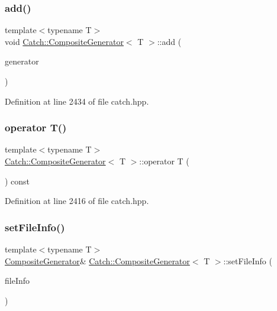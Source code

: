 \subsubsection{\texorpdfstring{add()}{add()}}
{\footnotesize\ttfamily template$<$typename T$>$ \\
void \hyperlink{class_catch_1_1_composite_generator}{Catch\+::\+Composite\+Generator}$<$ T $>$\+::add (\begin{DoxyParamCaption}\item[{const \hyperlink{struct_catch_1_1_i_generator}{I\+Generator}$<$ T $>$ $\ast$}]{generator }\end{DoxyParamCaption})\hspace{0.3cm}{\ttfamily [inline]}}



Definition at line 2434 of file catch.\+hpp.

\hypertarget{class_catch_1_1_composite_generator_a83d6c941e2e735b9528e6e832f7b76e7}{}\label{class_catch_1_1_composite_generator_a83d6c941e2e735b9528e6e832f7b76e7} 
\subsubsection{\texorpdfstring{operator T()}{operator T()}}
{\footnotesize\ttfamily template$<$typename T$>$ \\
\hyperlink{class_catch_1_1_composite_generator}{Catch\+::\+Composite\+Generator}$<$ T $>$\+::operator T (\begin{DoxyParamCaption}{ }\end{DoxyParamCaption}) const\hspace{0.3cm}{\ttfamily [inline]}}



Definition at line 2416 of file catch.\+hpp.

\hypertarget{class_catch_1_1_composite_generator_ac3c57cf4ca5472f440bf71e2936bcd4a}{}\label{class_catch_1_1_composite_generator_ac3c57cf4ca5472f440bf71e2936bcd4a} 
\subsubsection{\texorpdfstring{set\+File\+Info()}{setFileInfo()}}
{\footnotesize\ttfamily template$<$typename T$>$ \\
\hyperlink{class_catch_1_1_composite_generator}{Composite\+Generator}\& \hyperlink{class_catch_1_1_composite_generator}{Catch\+::\+Composite\+Generator}$<$ T $>$\+::set\+File\+Info (\begin{DoxyParamCaption}\item[{const char $\ast$}]{file\+Info }\end{DoxyParamCaption})\hspace{0.3cm}{\ttfamily [inline]}}



